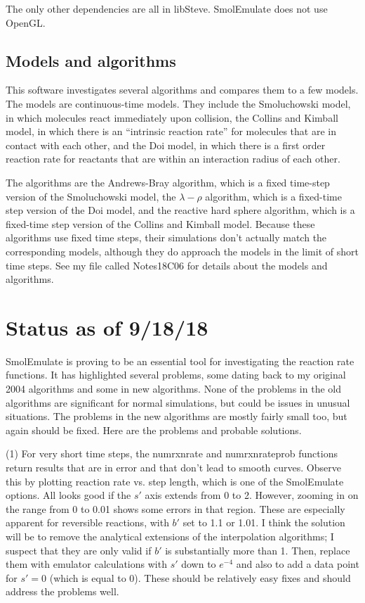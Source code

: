 \documentclass {book}
\begin{document}
The only other dependencies are all in libSteve. SmolEmulate does not use OpenGL.

\section{Models and algorithms}

This software investigates several algorithms and compares them to a few models. The models are continuous-time models. They include the Smoluchowski model, in which molecules react immediately upon collision, the Collins and Kimball model, in which there is an ``intrinsic reaction rate'' for molecules that are in contact with each other, and the Doi model, in which there is a first order reaction rate for reactants that are within an interaction radius of each other.

The algorithms are the Andrews-Bray algorithm, which is a fixed time-step version of the Smoluchowski model, the $\lambda - \rho$ algorithm, which is a fixed-time step version of the Doi model, and the reactive hard sphere algorithm, which is a fixed-time step version of the Collins and Kimball model. Because these algorithms use fixed time steps, their simulations don't actually match the corresponding models, although they do approach the models in the limit of short time steps. See my file called Notes18C06 for details about the models and algorithms.


\chapter{Status as of 9/18/18}

SmolEmulate is proving to be an essential tool for investigating the reaction rate functions. It has highlighted several problems, some dating back to my original 2004 algorithms and some in new algorithms. None of the problems in the old algorithms are significant for normal simulations, but could be issues in unusual situations. The problems in the new algorithms are mostly fairly small too, but again should be fixed. Here are the problems and probable solutions.

(1) For very short time steps, the numrxnrate and numrxnrateprob functions return results that are in error and that don't lead to smooth curves. Observe this by plotting reaction rate vs. step length, which is one of the SmolEmulate options. All looks good if the $s'$ axis extends from 0 to 2. However, zooming in on the range from 0 to 0.01 shows some errors in that region. These are especially apparent for reversible reactions, with $b'$ set to 1.1 or 1.01. I think the solution will be to remove the analytical extensions of the interpolation algorithms; I suspect that they are only valid if $b'$ is substantially more than 1. Then, replace them with emulator calculations with $s'$ down to $e^{-4}$ and also to add a data point for $s'=0$ (which is equal to 0). These should be relatively easy fixes and should address the problems well.
\end{document}
